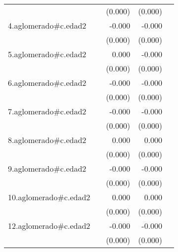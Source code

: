 {\begin{longtable}{l*{4}{D{.}{.}{-1}}}
            &                     &     (0.000)         &     (0.000)         &                     \\
\addlinespace
4.aglomerado#c.edad2&                     &      -0.000         &      -0.000\sym{***}&                     \\
            &                     &     (0.000)         &     (0.000)         &                     \\
\addlinespace
5.aglomerado#c.edad2&                     &       0.000         &      -0.000         &                     \\
            &                     &     (0.000)         &     (0.000)         &                     \\
\addlinespace
6.aglomerado#c.edad2&                     &      -0.000         &      -0.000\sym{**} &                     \\
            &                     &     (0.000)         &     (0.000)         &                     \\
\addlinespace
7.aglomerado#c.edad2&                     &      -0.000         &      -0.000\sym{*}  &                     \\
            &                     &     (0.000)         &     (0.000)         &                     \\
\addlinespace
8.aglomerado#c.edad2&                     &       0.000         &       0.000         &                     \\
            &                     &     (0.000)         &     (0.000)         &                     \\
\addlinespace
9.aglomerado#c.edad2&                     &      -0.000         &      -0.000         &                     \\
            &                     &     (0.000)         &     (0.000)         &                     \\
\addlinespace
10.aglomerado#c.edad2&                     &       0.000         &       0.000         &                     \\
            &                     &     (0.000)         &     (0.000)         &                     \\
\addlinespace
12.aglomerado#c.edad2&                     &      -0.000         &      -0.000         &                     \\
            &                     &     (0.000)         &     (0.000)         &                     \\

\end{longtable}}
